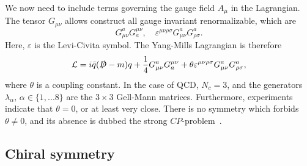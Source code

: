 We now need to include terms governing the gauge field $A_\mu$ in the Lagrangian.
The tensor $G_{\mu\nu}$ allows construct all gauge invariant renormalizable, which are
\begin{equation}
    G_{\mu \nu}^a G_a^{\mu \nu}, 
    \quad 
    \varepsilon^{\mu\nu\rho\sigma} G_{\mu \nu}^a G_{\rho \sigma}^a.
\end{equation}
Here, $\varepsilon$ is the Levi-Civita symbol.
The Yang-Mills Lagrangian is therefore
\begin{equation}
    \mathcal{L} = i  \bar q (\slashed{D} - m)q 
    + \frac{1}{4} G_{\mu \nu}^a G_a^{\mu \nu}
    + \theta \varepsilon^{\mu\nu\rho\sigma} G_{\mu \nu}^a G_{\rho \sigma}^a,
\end{equation}
where $\theta$ is a coupling constant. 
In the case of QCD, $N_c = 3$, and the generators $\lambda_\alpha, \, \alpha \in \{1, ... 8\}$ are the $3\times3$ Gell-Mann matrices.
Furthermore, experiments indicate that $\theta = 0$, or at least very close.
There is no symmetry which forbids $\theta \neq 0$, and its absence is dubbed the strong $CP$-problem~\cite{Schwartz:QFT}.

\subsection*{Chiral symmetry}

